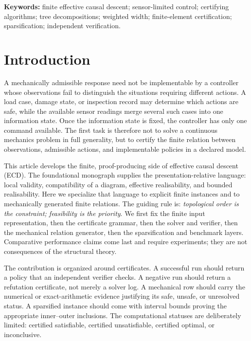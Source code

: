\documentclass[11pt]{article}
\theoremstyle{plain}
\theoremstyle{definition}
\theoremstyle{remark}
\begin{document}
\noindent\textbf{Keywords:} finite effective causal descent; sensor-limited control;
certifying algorithms; tree decompositions; weighted width; finite-element
certification; sparsification; independent verification.

\tableofcontents

\section{Introduction}
\label{sec:introduction}

A mechanically admissible response need not be implementable by a controller
whose observations fail to distinguish the situations requiring different
actions.  A load case, damage state, or inspection record may determine which
actions are safe, while the available sensor readings merge several such cases
into one information state.  Once the information state is fixed, the controller
has only one command available.  The first task is therefore not to solve a
continuous mechanics problem in full generality, but to certify the finite
relation between observations, admissible actions, and implementable policies in
a declared model.

This article develops the finite, proof-producing side of effective causal
descent (ECD).  The foundational monograph supplies the presentation-relative
language: local validity, compatibility of a diagram, effective realisability,
and bounded realisability.  Here we specialize that language to explicit finite
instances and to mechanically generated finite relations.  The guiding rule is:
\emph{topological order is the constraint; feasibility is the priority}.  We
first fix the finite input representation, then the certificate grammar, then
the solver and verifier, then the mechanical relation generator, then the
sparsification and benchmark layers.  Comparative performance claims come last
and require experiments; they are not consequences of the structural theory.

The contribution is organized around certificates.  A successful run should
return a policy that an independent verifier checks.  A negative run should
return a refutation certificate, not merely a solver log.  A mechanical row
should carry the numerical or exact-arithmetic evidence justifying its safe,
unsafe, or unresolved status.  A sparsified instance should come with interval
bounds proving the appropriate inner--outer inclusions.  The computational
statuses are deliberately limited: certified satisfiable, certified
unsatisfiable, certified optimal, or inconclusive.
\end{document}
